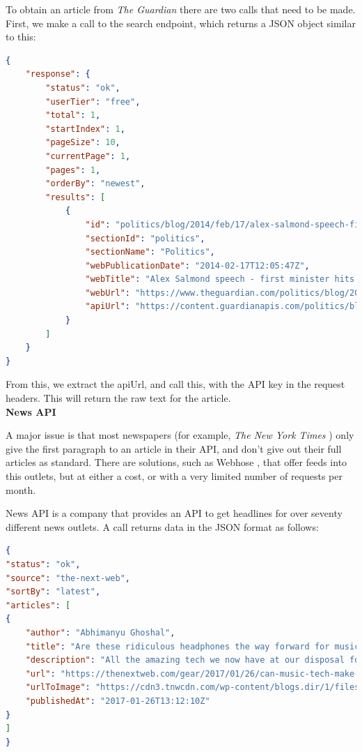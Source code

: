 \documentclass[12pt]{article}
\begin{document}
To obtain an article from \emph{The Guardian} there are two calls that need to be made. First, we make a call to the search endpoint, which returns a JSON object similar to this:

\begin{lstlisting}[language=json, firstnumber=1, caption={A sample response to an API call to The Guardian},captionpos=b]
{
    "response": {
        "status": "ok",
        "userTier": "free",
        "total": 1,
        "startIndex": 1,
        "pageSize": 10,
        "currentPage": 1,
        "pages": 1,
        "orderBy": "newest",
        "results": [
            {
                "id": "politics/blog/2014/feb/17/alex-salmond-speech-first-minister-scottish-independence-eu-currency-live",
                "sectionId": "politics",
                "sectionName": "Politics",
                "webPublicationDate": "2014-02-17T12:05:47Z",
                "webTitle": "Alex Salmond speech - first minister hits back over Scottish independence - live",
                "webUrl": "https://www.theguardian.com/politics/blog/2014/feb/17/alex-salmond-speech-first-minister-scottish-independence-eu-currency-live",
                "apiUrl": "https://content.guardianapis.com/politics/blog/2014/feb/17/alex-salmond-speech-first-minister-scottish-independence-eu-currency-live"
            }
        ]
    }
} 
\end{lstlisting}

From this, we extract the apiUrl, and call this, with the API key in the request headers. This will return the raw text for the article. \\

\textbf{News API}

A major issue is that most newspapers (for example, \emph{The New York Times} \cite{newYorkTimes}) only give the first paragraph to an article in their API, and don't give out their full articles as standard. There are solutions, such as Webhose \cite{webhose}, that offer feeds into this outlets, but at either a cost, or with a very limited number of requests per month. 

News API \cite{newsApi} is a company that provides an API to get headlines for over seventy different news outlets. A call returns data in the JSON format as follows:

\begin{lstlisting}[language=json, firstnumber=1, caption={A sample response to an API call to News API},captionpos=b]
{
"status": "ok",
"source": "the-next-web",
"sortBy": "latest",
"articles": [
{
	"author": "Abhimanyu Ghoshal",
	"title": "Are these ridiculous headphones the way forward for music tech?",
	"description": "All the amazing tech we now have at our disposal for enjoying music is closing us off from other people instead of bringing us together. Is there hope yet?",
	"url": "https://thenextweb.com/gear/2017/01/26/can-music-tech-make-us-sociable-again/",
	"urlToImage": "https://cdn3.tnwcdn.com/wp-content/blogs.dir/1/files/2017/01/Vinci-hed-1.jpg",
	"publishedAt": "2017-01-26T13:12:10Z"
}
]
}
\end{lstlisting}
\end{document}
